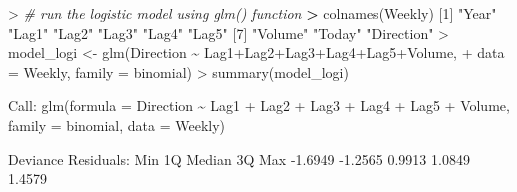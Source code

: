 \documentclass[
]{article}
\newenvironment{Shaded}{\begin{snugshade}}{\end{snugshade}}
\newcommand{\AttributeTok}[1]{\textcolor[rgb]{0.77,0.63,0.00}{#1}}
\newcommand{\CommentTok}[1]{\textcolor[rgb]{0.56,0.35,0.01}{\textit{#1}}}
\newcommand{\DecValTok}[1]{\textcolor[rgb]{0.00,0.00,0.81}{#1}}
\newcommand{\ErrorTok}[1]{\textcolor[rgb]{0.64,0.00,0.00}{\textbf{#1}}}
\newcommand{\FloatTok}[1]{\textcolor[rgb]{0.00,0.00,0.81}{#1}}
\newcommand{\FunctionTok}[1]{\textcolor[rgb]{0.00,0.00,0.00}{#1}}
\newcommand{\NormalTok}[1]{#1}
\newcommand{\OtherTok}[1]{\textcolor[rgb]{0.56,0.35,0.01}{#1}}
\newcommand{\SpecialCharTok}[1]{\textcolor[rgb]{0.00,0.00,0.00}{#1}}
\newcommand{\StringTok}[1]{\textcolor[rgb]{0.31,0.60,0.02}{#1}}
\begin{document}
\begin{Shaded}
\begin{Highlighting}[]
\SpecialCharTok{\textgreater{}} \CommentTok{\# run the logistic model using glm() function}
\ErrorTok{\textgreater{}} \FunctionTok{colnames}\NormalTok{(Weekly)}
\NormalTok{[}\DecValTok{1}\NormalTok{] }\StringTok{"Year"}      \StringTok{"Lag1"}      \StringTok{"Lag2"}      \StringTok{"Lag3"}      \StringTok{"Lag4"}      \StringTok{"Lag5"}     
\NormalTok{[}\DecValTok{7}\NormalTok{] }\StringTok{"Volume"}    \StringTok{"Today"}     \StringTok{"Direction"}
\SpecialCharTok{\textgreater{}}\NormalTok{ model\_logi }\OtherTok{\textless{}{-}} \FunctionTok{glm}\NormalTok{(Direction }\SpecialCharTok{\textasciitilde{}}\NormalTok{ Lag1}\SpecialCharTok{+}\NormalTok{Lag2}\SpecialCharTok{+}\NormalTok{Lag3}\SpecialCharTok{+}\NormalTok{Lag4}\SpecialCharTok{+}\NormalTok{Lag5}\SpecialCharTok{+}\NormalTok{Volume,}
\SpecialCharTok{+}                   \AttributeTok{data =}\NormalTok{ Weekly, }\AttributeTok{family =}\NormalTok{ binomial)}
\SpecialCharTok{\textgreater{}} \FunctionTok{summary}\NormalTok{(model\_logi)}

\NormalTok{Call}\SpecialCharTok{:}
\FunctionTok{glm}\NormalTok{(}\AttributeTok{formula =}\NormalTok{ Direction }\SpecialCharTok{\textasciitilde{}}\NormalTok{ Lag1 }\SpecialCharTok{+}\NormalTok{ Lag2 }\SpecialCharTok{+}\NormalTok{ Lag3 }\SpecialCharTok{+}\NormalTok{ Lag4 }\SpecialCharTok{+}\NormalTok{ Lag5 }\SpecialCharTok{+} 
\NormalTok{    Volume, }\AttributeTok{family =}\NormalTok{ binomial, }\AttributeTok{data =}\NormalTok{ Weekly)}

\NormalTok{Deviance Residuals}\SpecialCharTok{:} 
\NormalTok{    Min       1Q   Median       3Q      Max  }
\SpecialCharTok{{-}}\FloatTok{1.6949}  \SpecialCharTok{{-}}\FloatTok{1.2565}   \FloatTok{0.9913}   \FloatTok{1.0849}   \FloatTok{1.4579}  


\end{Highlighting}
\end{Shaded}
\end{document}
